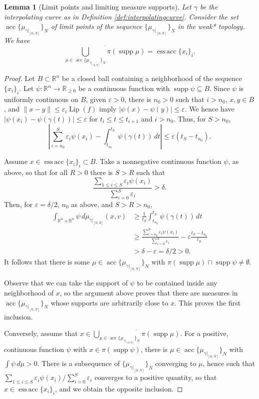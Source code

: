 \documentclass[11pt]{article}
\newtheorem{lem}[thm]{Lemma}
\theoremstyle{definition}
\theoremstyle{remark}
\DeclareMathOperator{\supp}{supp}
\DeclareMathOperator{\lip}{Lip}
\DeclareMathOperator{\acc}{acc}
\DeclareMathOperator{\essacc}{ess\,acc}
\newcommand{\R}{\mathbb{R}}
\renewcommand{\geq}{\geqslant}
\renewcommand{\leq}{\leqslant}
\newcommand{\meas}[2]{\mu_{#1|_{#2}}}
\begin{document}
%






\begin{lem}[Limit points and limiting measure supports]\label{lem:essaccsupp}
 Let $\gamma$ be the interpolating curve as in Definition \ref{def:interpolatingcurve}.
 Consider the set $\acc\{\meas{\gamma}{[0,N]}\}_N$ of limit points of the sequence $\{\meas{\gamma}{[0,N]}\}_N$ in the weak* topology. We have
 \[\overline{\bigcup_{\mu\in \acc\{\meas{\gamma}{[0,N]}\}_N}\pi(\supp \mu)}=\essacc\{x_i\}_i.\]
\end{lem}
\begin{proof}
 Let $B\subset\R^n$ be a closed ball containing a neighborhood of the sequence $\{x_i\}_i$.
 Let $\psi\colon\R^n\to\R_{\geq0}$ be a continuous function with $\supp\psi\subseteq B$. Since $\psi$ is uniformly continuous on $B$, given $\varepsilon>0$, there is $n_0>0$ such that $i>n_0$, $x,y\in B$, and $\|x-y\|\leq \varepsilon_i\lip(f)$ imply $|\psi(x)-\psi(y)|\leq \varepsilon$. We hence have $|\psi(x_i)-\psi(\gamma(t))|\leq \varepsilon$ for $t_i\leq t\leq t_{i+1}$ and $i>n_0$. Thus, for $S>n_0$,
 \[\left|\sum_{i=n_0}^S\varepsilon_i\psi(x_i)-\int_{t_{n_0}}^{t_S}\psi(\gamma(t))\,dt\right|\leq \varepsilon(t_S-t_{n_0}).\]
 
 Assume $x\in\essacc\{x_i\}_i\subset B$. Take a nonnegative continuous function $\psi$, as above, so that for all $R>0$ there is $S>R$ such that
 \[\frac{\sum_{1\leq i\leq S}\varepsilon_i\psi(x_i)}{\sum_{i=0}^S\varepsilon_i}>\delta.\]
 Then, for $\varepsilon=\delta/2$,  $n_0$ as above, and $S>R>n_0$,
 \begin{align*}
  \int_{\R^n\times\R^n}\psi\,d\meas{\gamma}{[0,S]}(x,v)
   &\geq\frac{1}{t_S} \int_{t_{n_0}}^{t_S}\psi(\gamma(t))\,dt \\
   &\geq 
  \frac{ \sum_{i=n_0}^S\varepsilon_i\psi(x_i)}{\sum_{i=0}^S\varepsilon_i}-\varepsilon \frac{t_S-t_{n_0}}{t_S}\\
   &>\delta-\varepsilon=\delta/2>0.
 \end{align*}
 It follows that there is some $\mu\in\acc\{\meas{\gamma}{[0,N]}\}_N$ with $\pi(\supp\mu)\cap\supp\psi\neq \emptyset$. 
 
 Observe that we can take the support of $\psi$ to be contained inside any neighborhood of $x$, so the argument above proves that there are measures in $\acc\{\meas{\gamma}{[0,N]}\}_N$ whose supports are arbitrarily close to $x$. 
 This proves the first inclusion.
 
  Conversely, assume that $x \in \overline{\bigcup_{\mu\in \acc\{\meas{\gamma}{[0,N]}\}_N}\pi(\supp \mu)}$. For a positive, continuous function $\psi$ with $x\in\pi(\supp\psi)$, there is $\mu \in \acc\{\meas{\gamma}{[0,N]}\}_N$ with $\int\psi\,d\mu > 0$. There is a subsequence of $\{\meas{\gamma}{[0,N]}\}_N$ converging to $\mu$, hence such that ${\sum_{1\leq i\leq S}\varepsilon_i\psi(x_i)}/{\sum_{i=0}^S\varepsilon_i}$ converges to a positive quantity, so that $x \in \essacc\{x_i\}_i$, and we obtain the opposite inclusion.
\end{proof}
\end{document}
